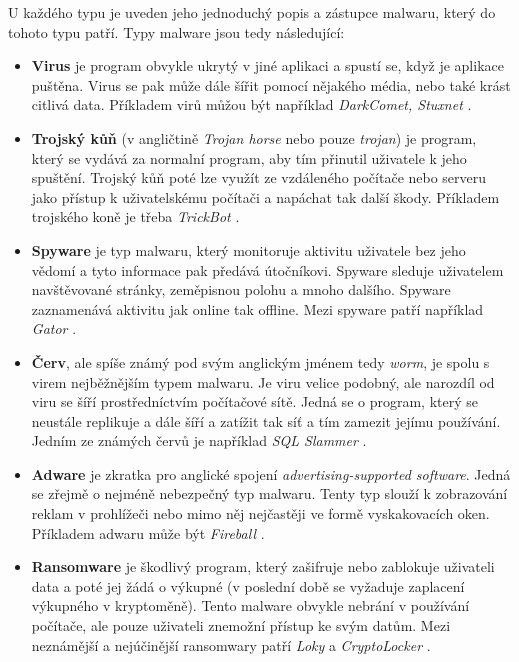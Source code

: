 U každého typu je uveden jeho jednoduchý popis a zástupce malwaru, který do tohoto typu patří. Typy malware jsou tedy následující: %
\begin{itemize}
    \item \textbf{Virus} je program obvykle ukrytý v jiné aplikaci a spustí se, když je aplikace puštěna. Virus se pak může dále šířit pomocí nějakého média, nebo také krást citlivá data. Příkladem virů můžou být například \textit{DarkComet, Stuxnet} \cite{malware_types, kaspersky}. 
    \item \textbf{Trojský kůň} (v angličtině \textit{Trojan horse} nebo pouze \textit{trojan}) je program, který se vydává za normalní program, aby tím přinutil uživatele k jeho spuštění. Trojský kůň poté lze využít ze vzdáleného počítače nebo serveru jako přístup k uživatelskému počítači a napáchat tak další škody. Příkladem trojského koně je třeba \textit{TrickBot} \cite{article_malware, kaspersky}.  
    \item \textbf{Spyware} je typ malwaru, který monitoruje aktivitu uživatele bez jeho vědomí a tyto informace pak předává útočníkovi. Spyware sleduje uživatelem navštěvované stránky, zeměpisnou polohu a mnoho dalšího. Spyware zaznamenává aktivitu jak online tak offline. Mezi spyware patří například \textit{Gator} \cite{malware_wiki}.
    \item \textbf{Červ}, ale spíše známý pod svým anglickým jménem tedy \textit{worm}, je spolu s virem nejběžnějším typem malwaru. Je viru velice podobný, ale narozdíl od viru se šíří prostředníctvím počítačové sítě. Jedná se o program, který se neustále replikuje a dále šíří a zatížit tak síť a tím zamezit jejímu používání. Jedním ze známých červů je například \textit{SQL Slammer} \cite{article_malware,malware_book}. 
    \newpage
    \item \textbf{Adware} je zkratka pro anglické spojení \textit{advertising-supported software}. Jedná se zřejmě o nejméně nebezpečný typ malwaru. Tenty typ slouží k zobrazování reklam v prohlížeči nebo mimo něj nejčastěji ve formě vyskakovacích oken. Příkladem adwaru může být \textit{Fireball} \cite{article_malware, malware_wiki}.
    \item \textbf{Ransomware} je škodlivý program, který zašifruje nebo zablokuje uživateli data a poté jej žádá o výkupné (v poslední době se vyžaduje zaplacení výkupného v kryptoměně). Tento malware obvykle nebrání v používání počítače, ale pouze uživateli znemožní přístup ke svým datům. Mezi neznámější a nejúčinější ransomwary patří \textit{Loky} a \textit{CryptoLocker} \cite{article_malware,kaspersky}.

\end{itemize}
